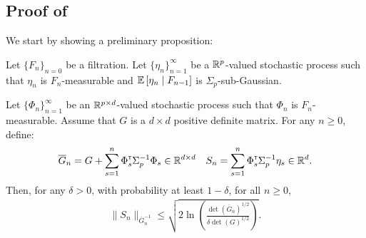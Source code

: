 \documentclass{article}
\begin{document}
\subsection{Proof of }

We start by showing a preliminary proposition:

\begin{proposition}
\label{prop:concentration}
Let $\{F_n\}_{n=0}$ be a filtration.
Let $\{\eta_n\}_{n=1}^\infty$ be a $\mathbb{R}^p$-valued stochastic process such that $\eta_n$ is $F_n$-measurable and $\operatorname*{\mathbb{E}}\left[\eta_n\;\middle|\; F_{n-1}\right]$ is $\Sigma_p$-sub-Gaussian.

Let $\{\Phi_n\}_{n=1}^\infty$ be an $\mathbb{R}^{p\times d}$-valued stochastic process such that $\Phi_n$ is $F_n$-measurable. Assume that $G$ is a $d\times d$ positive definite matrix. For any $n\geq 0$, define:
\begin{equation*}
    \overline{G}_n = G + \sum_{s=1}^n \Phi_s^{\mathsf{\scriptscriptstyle T}} \Sigma_p^{-1} \Phi_s \in \mathbb{R}^{d\times d} \quad S_n = \sum_{s=1}^n \Phi_s^{\mathsf{\scriptscriptstyle T}}\Sigma_p^{-1}\eta_s \in \mathbb{R}^{d}.
\end{equation*}
Then, for any $\delta>0$, with probability at least $1-\delta$, for all $n\geq0$,
\begin{align*}
\| S_n \|_{\overline{G}_n^{-1}} \leq \sqrt{2\ln \left(\frac{\det\left(\overline{G}_n\right)^{1/2}}{\delta\det(G)^{1/2}}\right)}.
\end{align*}
\end{proposition}
\end{document}
